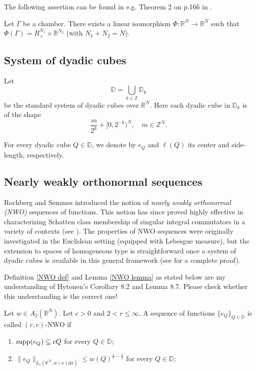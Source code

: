 \documentclass{amsart}
\begin{document}
The following assertion can be found in e.g. Theorem 2 on p.166 in \cite{Bourbaki}.

\begin{theorem}\label{phi theorem} Let $\Gamma$ be a chamber. There exists a linear isomorphism $\Phi:\mathbb{R}^N\to\mathbb{R}^N$ such that $\Phi(\Gamma)=R_+^{N_1}\times\mathbb{R}^{N_2}$ (with $N_1+N_2=N$).
\end{theorem}




\subsection{System of dyadic cubes}

\begin{nota}\label{standardsystem}
Let
$$\mathbb{D}=\bigcup_{k\in\mathbb{Z}}\mathbb{D}_k$$
be the standard system of dyadic cubes over $\mathbb{R}^N.$ Here each dyadic cube in $\mathbb{D}_k$ is of the shape
$$\frac{m}{2^k}+[0,2^{-k})^N,\quad m\in\mathbb{Z}^N.$$

For every dyadic cube $Q\in\mathbb{D}$, we denote by $c_Q$ and $\ell(Q)$ its center and side-length, respectively.
\end{nota}


\subsection{Nearly weakly  orthonormal sequences}
Rochberg and Semmes \cite{RS} introduced the notion of \emph{nearly weakly  orthonormal (NWO)} sequences of functions. This notion has since proved highly effective in characterizing Schatten class membership of  singular integral commutators in a variety of contexts (see \cite{FLLXarxiv,HKarxiv,MR4756021,MR4552581,MR4873796,LLW,RS,Zhangwei1,Zhangwei2}). The properties of NWO sequences were originally investigated in the Euclidean setting (equipped with Lebesgue measure), but the extension to spaces of homogeneous type is straightforward once a system of dyadic cubes is available in this general framework (see \cite[Section 13]{HKarxiv} for a complete proof).

{\color{red} Definition \ref{NWO def} and Lemma \ref{NWO lemma} as stated below are my understanding of Hytonen's Corollary 8.2 and Lemma 8.7. Please check whether this understanding is the correct one!}

\begin{definition}\label{NWO def} Let $w\in A_2(\mathbb{R}^N).$ Let $c>0$ and $2<r\leq\infty.$ A sequence of functions $\{e_Q\}_{Q\in\mathbb{D}}$ is called $(r,c)$-NWO if
\begin{enumerate}[{\rm (i)}]
\item ${\rm supp}(e_Q)\subseteq cQ$ for every $Q\in\mathbb{D};$ 
\item $\|e_Q\|_{L_r(\mathbb{R}^N,w(x)dx)}\leq w(Q)^{\frac1r-\frac12}$ for every $Q\in\mathbb{D};$
\end{enumerate}
\end{definition}
\end{document}

